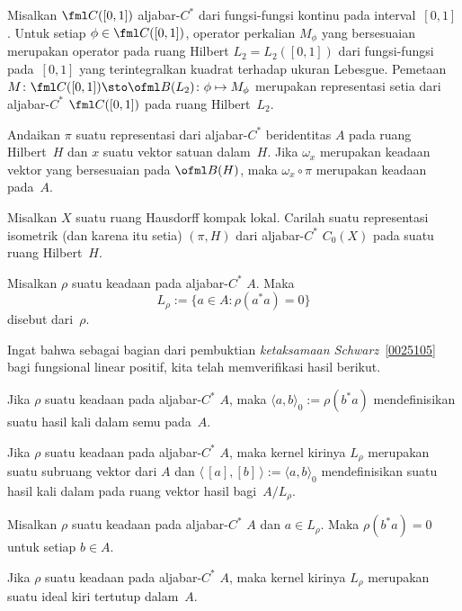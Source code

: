 \begin{exam} Misalkan $\fml C([0,1])$ aljabar-$C^*$ dari fungsi-fungsi kontinu
pada interval~$[0,1]$. Untuk setiap $\phi \in \fml C([0,1])$, operator perkalian
$M_\phi$ yang bersesuaian merupakan operator pada ruang Hilbert $L_2 = L_2([0,1])$
dari fungsi-fungsi pada~$[0,1]$ yang terintegralkan kuadrat terhadap ukuran Lebesgue.
Pemetaan $M\colon \fml C([0,1]) \sto \ofml B(L_2)\colon \phi \mapsto M_\phi$ merupakan
representasi setia dari aljabar-$C^*$ $\fml C([0,1])$ pada ruang Hilbert~$L_2$.
\end{exam}

\begin{exam} Andaikan $\pi$ suatu representasi dari aljabar-$C^*$ beridentitas $A$ pada
ruang Hilbert~$H$ dan $x$ suatu vektor satuan dalam~$H$. Jika $\omega _x$ merupakan
keadaan vektor yang bersesuaian pada $\ofml B(H)$, maka $\omega_x \circ \pi$ merupakan keadaan pada~$A$.
\end{exam}

\begin{exer} Misalkan $X$ suatu ruang Hausdorff kompak lokal. Carilah suatu representasi
isometrik (dan karena itu setia) $(\pi,H)$ dari aljabar-$C^*$ $C_0(X)$ pada suatu
ruang Hilbert~$H$.
\end{exer}

\begin{defn} Misalkan $\rho$ suatu keadaan pada aljabar-$C^*$ $A$. Maka
   \[ L_\rho := \{a \in A\colon \rho(a^*a) = 0\} \]
disebut
 dari~$\rho$.
\end{defn}

Ingat bahwa sebagai bagian dari pembuktian \emph{ketaksamaan Schwarz}~\ref{0025105} bagi fungsional
linear positif, kita telah memverifikasi hasil berikut.

\begin{prop} Jika $\rho$ suatu keadaan pada aljabar-$C^*$ $A$, maka $\langle a,b \rangle_0 :=
\rho(b^*a)$ mendefinisikan suatu hasil kali dalam semu pada~$A$.
\end{prop}

\begin{cor} Jika $\rho$ suatu keadaan pada aljabar-$C^*$ $A$, maka kernel kirinya $L_\rho$ merupakan suatu
subruang vektor dari $A$ dan $\langle\,[a],[b]\,\rangle := \langle a,b \rangle_0$ mendefinisikan
suatu hasil kali dalam pada ruang vektor hasil bagi~$A/L_\rho$.
\end{cor}

\begin{prop} Misalkan $\rho$ suatu keadaan pada aljabar-$C^*$ $A$ dan $a \in L_\rho$. Maka $\rho(b^*a)
= 0$ untuk setiap $b \in A$.
\end{prop}

\begin{prop} Jika $\rho$ suatu keadaan pada aljabar-$C^*$ $A$, maka kernel kirinya $L_\rho$ merupakan suatu
ideal kiri tertutup dalam~$A$.
\end{prop}
























